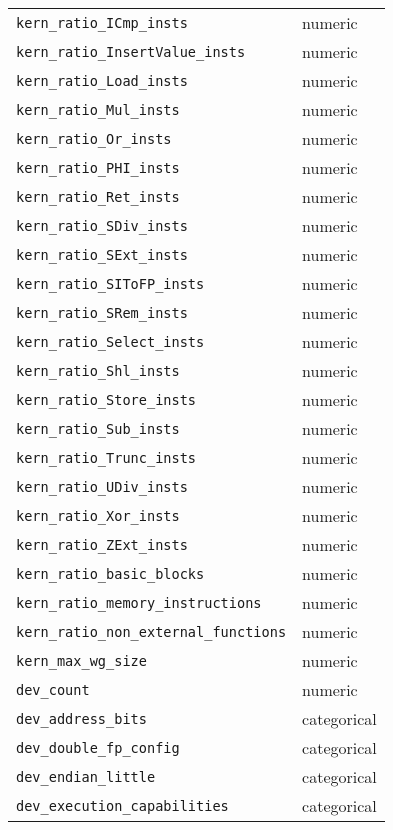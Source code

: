 \begin{tabular}{ll}
              \texttt{kern\_ratio\_ICmp\_insts} &      numeric \\
       \texttt{kern\_ratio\_InsertValue\_insts} &      numeric \\
              \texttt{kern\_ratio\_Load\_insts} &      numeric \\
               \texttt{kern\_ratio\_Mul\_insts} &      numeric \\
                \texttt{kern\_ratio\_Or\_insts} &      numeric \\
               \texttt{kern\_ratio\_PHI\_insts} &      numeric \\
               \texttt{kern\_ratio\_Ret\_insts} &      numeric \\
              \texttt{kern\_ratio\_SDiv\_insts} &      numeric \\
              \texttt{kern\_ratio\_SExt\_insts} &      numeric \\
            \texttt{kern\_ratio\_SIToFP\_insts} &      numeric \\
              \texttt{kern\_ratio\_SRem\_insts} &      numeric \\
            \texttt{kern\_ratio\_Select\_insts} &      numeric \\
               \texttt{kern\_ratio\_Shl\_insts} &      numeric \\
             \texttt{kern\_ratio\_Store\_insts} &      numeric \\
               \texttt{kern\_ratio\_Sub\_insts} &      numeric \\
             \texttt{kern\_ratio\_Trunc\_insts} &      numeric \\
              \texttt{kern\_ratio\_UDiv\_insts} &      numeric \\
               \texttt{kern\_ratio\_Xor\_insts} &      numeric \\
              \texttt{kern\_ratio\_ZExt\_insts} &      numeric \\
            \texttt{kern\_ratio\_basic\_blocks} &      numeric \\
     \texttt{kern\_ratio\_memory\_instructions} &      numeric \\
 \texttt{kern\_ratio\_non\_external\_functions} &      numeric \\
                   \texttt{kern\_max\_wg\_size} &      numeric \\
                            \texttt{dev\_count} &      numeric \\
                    \texttt{dev\_address\_bits} &  categorical \\
               \texttt{dev\_double\_fp\_config} &  categorical \\
                   \texttt{dev\_endian\_little} &  categorical \\
          \texttt{dev\_execution\_capabilities} &  categorical \\
\bottomrule
\end{tabular}

